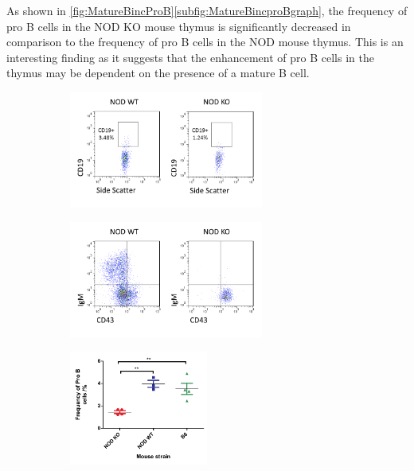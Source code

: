 As shown in \cref{fig:MatureBincProB}\ref{subfig:MatureBincproBgraph}, the frequency of pro B cells in the NOD KO mouse thymus is significantly decreased in comparison to the frequency of pro B cells in the NOD mouse thymus.
This is an interesting finding as it suggests that the enhancement of pro B cells in the thymus may be dependent on the presence of a mature B cell.


\begin{figure}
	\begin{subfigure}{\textwidth}
	\caption{}
	\includegraphics[width=0.7\textwidth]{Figures/NODvKOproBcells.png}
	\label{subfig:ThyProBcells}
	\end{subfigure}
	\begin{subfigure}{\textwidth}
	\caption{}
	\includegraphics[width=0.7\textwidth]{Figures/NODvKOBM.png}
	\label{subfig:KOBM}
	\end{subfigure}
	\begin{subfigure}{\textwidth}
	\caption{}
	\includegraphics[width=0.5\textwidth]{Figures/MatureBincproBgraph.pdf}

\end{subfigure}
\end{figure}

